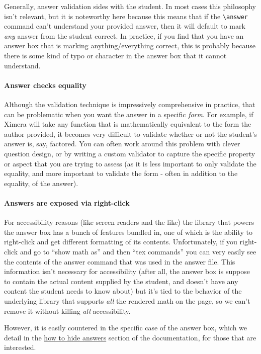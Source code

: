 \documentclass{ximera}
\begin{document}
Generally, answer validation sides with the student. In most cases this
philosophy isn't relevant, but it is noteworthy here because this means that if
the \verb|\answer| command can't understand your provided answer, then it will
default to mark \textit{any} answer from the student correct. In practice, if
you find that you have an answer box that is marking anything/everything
correct, this is probably because there is some kind of typo or character in
the answer box that it cannot understand.

\paragraph{Answer checks equality}

Although the validation technique is impressively comprehensive in
practice, that can be problematic when you want the answer in a specific
\textit{form}. For example, if Ximera will take any function that is
mathematically equivalent to the form the author provided, it becomes very
difficult to validate whether or not the student's answer is, say, factored.
You can often work around this problem with clever question design, or by
writing a custom validator to capture the specific property or aspect that you
are trying to assess (as it is less important to only validate the equality,
and more important to validate the form - often in addition to the equality, of
the answer).

\paragraph{Answers are exposed via right-click}

For accessibility reasons (like screen readers and the like) the library
that powers the answer box has a bunch of features bundled in, one of which is
the ability to right-click and get different formatting of its contents.
Unfortunately, if you right-click and go to ``show math as'' and then ``tex
commands'' you can very easily see the contents of the answer command that was
used in the answer file. This information isn't necessary for accessibility
(after all, the answer box is suppose to contain the actual content supplied by
the student, and doesn't have any content the student needs to know about) but
it's tied to the behavior of the underlying library that supports \textit{all}
the rendered math on the page, so we can't remove it without killing
\textit{all} accessibility.

However, it is easily countered in the specific case of the answer box,
which we detail in the
\href{https://xronos.clas.ufl.edu/examples/exampleCore/supplemental/hiddenAnswers}{how
  to hide answers} section of the documentation, for those that are interested.
\end{document}
